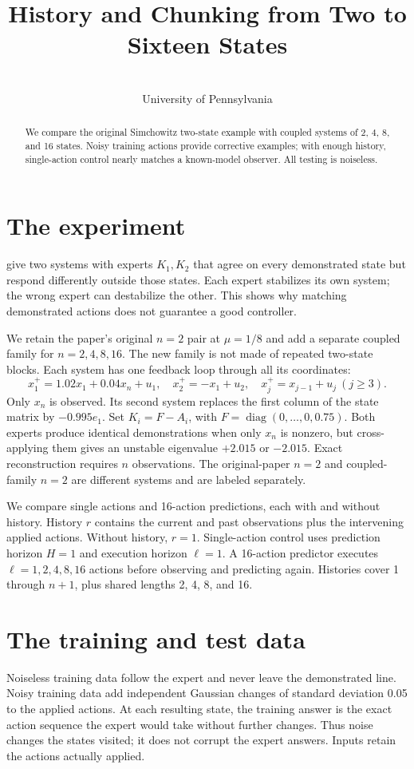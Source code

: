\documentclass{l4dc2026}
\title[History, Coverage, and Chunking]{History and Chunking from Two to Sixteen States}
\author{\Name{Nihar Ballamudi}\and\Name{Kyle Horton}\\\addr University of Pennsylvania}
\begin{document}
\maketitle
\begin{abstract}
We compare the original Simchowitz two-state example with coupled systems of 2, 4, 8, and 16 states. Noisy training actions provide corrective examples; with enough history, single-action control nearly matches a known-model observer. All testing is noiseless.
\end{abstract}

\section{The experiment}
\citet{simchowitz2025} give two systems with experts $K_1,K_2$ that agree on every demonstrated state but respond differently outside those states. Each expert stabilizes its own system; the wrong expert can destabilize the other. This shows why matching demonstrated actions does not guarantee a good controller.

We retain the paper's original $n=2$ pair at $\mu=1/8$ and add a separate coupled family for $n=2,4,8,16$. The new family is not made of repeated two-state blocks. Each system has one feedback loop through all its coordinates:
\[
x_1^+=1.02x_1+0.04x_n+u_1,\quad
x_2^+=-x_1+u_2,\quad x_j^+=x_{j-1}+u_j\ (j\ge3).
\]
Only $x_n$ is observed. Its second system replaces the first column of the state matrix by $-0.995e_1$. Set $K_i=F-A_i$, with $F=\operatorname{diag}(0,\ldots,0,0.75)$. Both experts produce identical demonstrations when only $x_n$ is nonzero, but cross-applying them gives an unstable eigenvalue $+2.015$ or $-2.015$. Exact reconstruction requires $n$ observations. The original-paper $n=2$ and coupled-family $n=2$ are different systems and are labeled separately.

We compare single actions and 16-action predictions, each with and without history. History $r$ contains the current and past observations plus the intervening applied actions. Without history, $r=1$. Single-action control uses prediction horizon $H=1$ and execution horizon $\ell=1$. A 16-action predictor executes $\ell=1,2,4,8,16$ actions before observing and predicting again. Histories cover 1 through $n+1$, plus shared lengths 2, 4, 8, and 16.

\section{The training and test data}
Noiseless training data follow the expert and never leave the demonstrated line. Noisy training data add independent Gaussian changes of standard deviation 0.05 to the applied actions. At each resulting state, the training answer is the exact action sequence the expert would take without further changes. Thus noise changes the states visited; it does not corrupt the expert answers. Inputs retain the actions actually applied.
\end{document}

